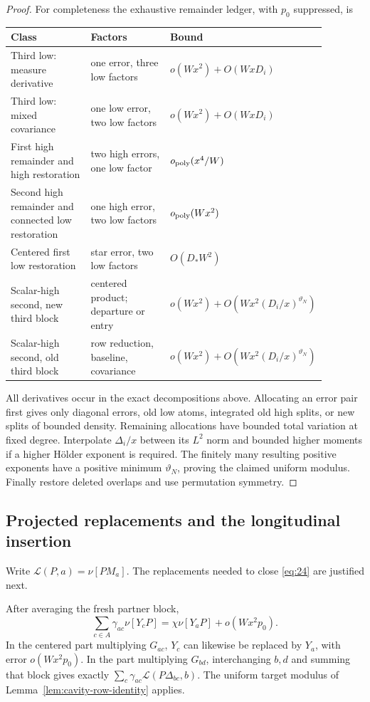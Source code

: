 \begin{proof}
For completeness the exhaustive remainder
ledger, with \(p_0\) suppressed, is
\begin{center}
\small
\begin{tabular}{p{0.29\linewidth}p{0.29\linewidth}p{0.30\linewidth}}
\toprule
Class & Factors & Bound\\
\midrule
Third low: measure derivative &
one error, three low factors &
\(o(Wx^2)+O(WxD_i)\)\\
Third low: mixed covariance &
one low error, two low factors &
\(o(Wx^2)+O(WxD_i)\)\\
First high remainder and high restoration &
two high errors, one low factor &
\(o_{\rm poly}(x^4/W)\)\\
Second high remainder and connected low restoration &
one high error, two low factors &
\(o_{\rm poly}(Wx^2)\)\\
Centered first low restoration &
star error, two low factors &
\(O(D_*W^2)\)\\
Scalar-high second, new third block &
centered product; departure or entry &
\(o(Wx^2)+O(Wx^2(D_i/x)^{\vartheta_N})\)\\
Scalar-high second, old third block &
row reduction, baseline, covariance &
\(o(Wx^2)+O(Wx^2(D_i/x)^{\vartheta_N})\)\\
\bottomrule
\end{tabular}
\end{center}
All derivatives occur in the exact decompositions
above. Allocating an error pair first gives only
diagonal errors, old low atoms, integrated old
high splits, or new splits of bounded density.
Remaining allocations have bounded total
variation at fixed degree. Interpolate
\(\Delta_i/x\) between its \(L^2\) norm and
bounded higher moments if a higher H\"older
exponent is required. The finitely many
resulting positive exponents have a positive
minimum \(\vartheta_N\), proving the claimed
uniform modulus. Finally restore deleted
overlaps and use permutation symmetry.
\end{proof}

\subsection{Projected replacements and the longitudinal insertion}

Write \(\mathcal L(P,a)=\nu[PM_a]\). The replacements needed
to close \eqref{eq:24} are justified next.

\begin{lemma}\label{lem:cavity-replacements}
After averaging the fresh partner block,
\[
 \sum_{c\in A}\gamma_{ac}\nu[Y_cP]
              =\chi\nu[Y_aP]+o(Wx^2p_0).
\]
In the centered part multiplying \(G_{ac}\), \(Y_c\) can
likewise be replaced by \(Y_a\), with error \(o(Wx^2p_0)\).
In the part multiplying \(G_{bd}\), interchanging \(b,d\)
and summing that block gives exactly
\(\sum_c\gamma_{ac}\mathcal L(P\Delta_{bc},b)\).
The uniform target modulus of
Lemma~\ref{lem:cavity-row-identity} applies.
\end{lemma}

